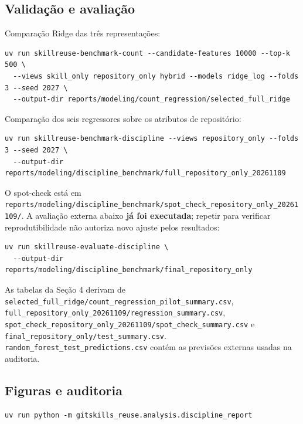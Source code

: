 \subsection{Validação e
avaliação}\label{validauxe7uxe3o-e-avaliauxe7uxe3o}

Comparação Ridge das três representações:

\begin{verbatim}
uv run skillreuse-benchmark-count --candidate-features 10000 --top-k 500 \
  --views skill_only repository_only hybrid --models ridge_log --folds 3 --seed 2027 \
  --output-dir reports/modeling/count_regression/selected_full_ridge
\end{verbatim}

Comparação dos seis regressores sobre os atributos de repositório:

\begin{verbatim}
uv run skillreuse-benchmark-discipline --views repository_only --folds 3 --seed 2027 \
  --output-dir reports/modeling/discipline_benchmark/full_repository_only_20261109
\end{verbatim}

O spot-check está em
\texttt{reports/modeling/discipline\_benchmark/spot\_check\_repository\_only\_20261109/}.
A avaliação externa abaixo \textbf{já foi executada}; repetir para
verificar reprodutibilidade não autoriza novo ajuste pelos resultados:

\begin{verbatim}
uv run skillreuse-evaluate-discipline \
  --output-dir reports/modeling/discipline_benchmark/final_repository_only
\end{verbatim}

As tabelas da Seção 4 derivam de
\texttt{selected\_full\_ridge/count\_regression\_pilot\_summary.csv},
\texttt{full\_repository\_only\_20261109/regression\_summary.csv},
\texttt{spot\_check\_repository\_only\_20261109/spot\_check\_summary.csv}
e \texttt{final\_repository\_only/test\_summary.csv}.
\texttt{random\_forest\_test\_predictions.csv} contém as previsões
externas usadas na auditoria.

\subsection{Figuras e auditoria}\label{figuras-e-auditoria}

\begin{verbatim}
uv run python -m gitskills_reuse.analysis.discipline_report
\end{verbatim}

